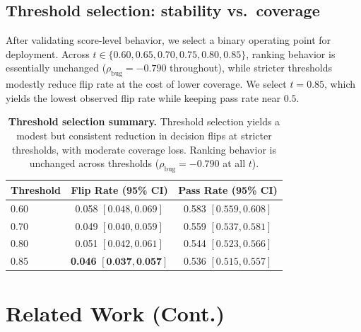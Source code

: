 \documentclass{article}
\begin{document}
\subsection{Threshold selection: stability vs.\ coverage}
After validating score-level behavior, we select a binary operating point for deployment. Across \(t\in\{0.60,0.65,0.70,0.75,0.80,0.85\}\), ranking behavior is essentially unchanged (\(\rho_{\text{bug}}=-0.790\) throughout), while stricter thresholds modestly reduce flip rate at the cost of lower coverage. We select \(t=0.85\), which yields the lowest observed flip rate while keeping pass rate near \(0.5\).

\begin{table}[t]
  \centering
  \small
  \begin{tabular}{lcc}
    \toprule
    \textbf{Threshold} & \textbf{Flip Rate (95\% CI)}                        & \textbf{Pass Rate (95\% CI)} \\
    \midrule
    0.60               & 0.058 \([0.048, 0.069]\)                            & 0.583 \([0.559, 0.608]\)     \\
    0.70               & 0.049 \([0.040, 0.059]\)                            & 0.559 \([0.537, 0.581]\)     \\
    0.80               & 0.051 \([0.042, 0.061]\)                            & 0.544 \([0.523, 0.566]\)     \\
    0.85               & \textbf{0.046} \([\textbf{0.037}, \textbf{0.057}]\) & 0.536 \([0.515, 0.557]\)     \\
    \bottomrule
  \end{tabular}
  \caption{\textbf{Threshold selection summary.}
    Threshold selection yields a modest but consistent reduction in decision flips at stricter thresholds, with moderate coverage loss.
    Ranking behavior is unchanged across thresholds (\(\rho_{\text{bug}}=-0.790\) at all \(t\)).}
  \label{tab:exp13_threshold_sweep}
\end{table}


\section{Related Work (Cont.)}\label{sec:related-work-cont}
\end{document}
